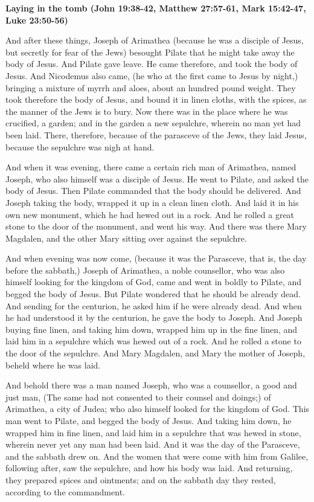 \textbf{Laying in the tomb (John 19:38-42, Matthew 27:57-61, Mark 15:42-47, Luke 23:50-56)}

And after these things, Joseph of Arimathea (because he was a disciple of Jesus, but secretly for fear of the Jews)
besought Pilate that he might take away the body of Jesus. And Pilate gave leave. He came therefore, and took the body
of Jesus. And Nicodemus also came, (he who at the first came to Jesus by night,) bringing a mixture of myrrh and aloes,
about an hundred pound weight. They took therefore the body of Jesus, and bound it in linen cloths, with the spices, as
the manner of the Jews is to bury. Now there was in the place where he was crucified, a garden; and in the garden a new
sepulchre, wherein no man yet had been laid. There, therefore, because of the parasceve of the Jews, they laid Jesus,
because the sepulchre was nigh at hand.

And when it was evening, there came a certain rich man of Arimathea, named Joseph, who also himself was a disciple of
Jesus. He went to Pilate, and asked the body of Jesus. Then Pilate commanded that the body should be delivered. And
Joseph taking the body, wrapped it up in a clean linen cloth. And laid it in his own new monument, which he had hewed
out in a rock. And he rolled a great stone to the door of the monument, and went his way. And there was there Mary
Magdalen, and the other Mary sitting over against the sepulchre.

And when evening was now come, (because it was the Parasceve, that is, the day before the sabbath,) Joseph of Arimathea,
a noble counsellor, who was also himself looking for the kingdom of God, came and went in boldly to Pilate, and begged
the body of Jesus. But Pilate wondered that he should be already dead. And sending for the centurion, he asked him if
he were already dead. And when he had understood it by the centurion, he gave the body to Joseph. And Joseph buying
fine linen, and taking him down, wrapped him up in the fine linen, and laid him in a sepulchre which was hewed out of a
rock. And he rolled a stone to the door of the sepulchre. And Mary Magdalen, and Mary the mother of Joseph, beheld
where he was laid.

And behold there was a man named Joseph, who was a counsellor, a good and just man, (The same had not consented to their
counsel and doings;) of Arimathea, a city of Judea; who also himself looked for the kingdom of God. This man went to
Pilate, and begged the body of Jesus. And taking him down, he wrapped him in fine linen, and laid him in a sepulchre
that was hewed in stone, wherein never yet any man had been laid. And it was the day of the Parasceve, and the sabbath
drew on. And the women that were come with him from Galilee, following after, saw the sepulchre, and how his body was
laid. And returning, they prepared spices and ointments; and on the sabbath day they rested, according to the
commandment.

